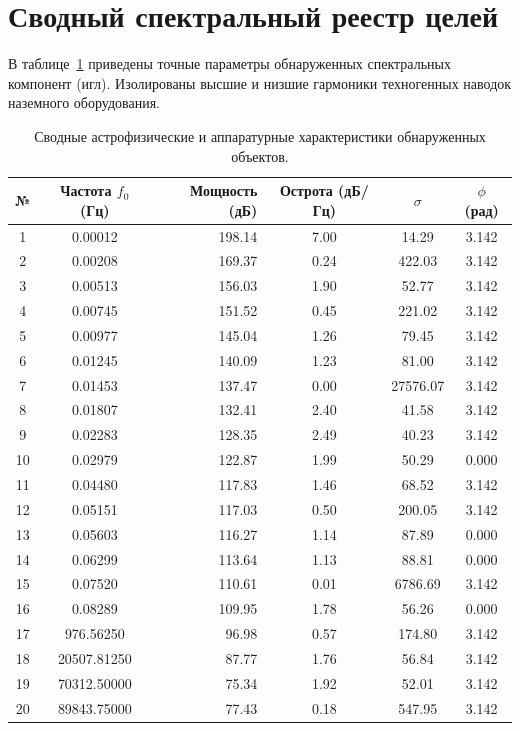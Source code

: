 \documentclass[11pt,twocolumn]{article}
\begin{document}
\section{Сводный спектральный реестр целей}
В таблице~\ref{tab:targets} приведены точные параметры обнаруженных спектральных компонент (игл). 
Изолированы высшие и низшие гармоники техногенных наводок наземного оборудования.\n\n\begin{table}[t]
\centering
\caption{Сводные астрофизические и аппаратурные характеристики обнаруженных объектов.}
\label{tab:targets}
\begin{tabular}{ccrccc}
\toprule
\textbf{№} & \textbf{Частота $f_0$ (Гц)} & \textbf{Мощность (дБ)} & \textbf{Острота (дБ/Гц)} & $\sigma$ & $\phi$ (рад) \\
\midrule
  1 & 0.00012 & 198.14 & 7.00 & 14.29 & 3.142 \\
  2 & 0.00208 & 169.37 & 0.24 & 422.03 & 3.142 \\
  3 & 0.00513 & 156.03 & 1.90 & 52.77 & 3.142 \\
  4 & 0.00745 & 151.52 & 0.45 & 221.02 & 3.142 \\
  5 & 0.00977 & 145.04 & 1.26 & 79.45 & 3.142 \\
  6 & 0.01245 & 140.09 & 1.23 & 81.00 & 3.142 \\
  7 & 0.01453 & 137.47 & 0.00 & 27576.07 & 3.142 \\
  8 & 0.01807 & 132.41 & 2.40 & 41.58 & 3.142 \\
  9 & 0.02283 & 128.35 & 2.49 & 40.23 & 3.142 \\
  10 & 0.02979 & 122.87 & 1.99 & 50.29 & 0.000 \\
  11 & 0.04480 & 117.83 & 1.46 & 68.52 & 3.142 \\
  12 & 0.05151 & 117.03 & 0.50 & 200.05 & 3.142 \\
  13 & 0.05603 & 116.27 & 1.14 & 87.89 & 0.000 \\
  14 & 0.06299 & 113.64 & 1.13 & 88.81 & 0.000 \\
  15 & 0.07520 & 110.61 & 0.01 & 6786.69 & 3.142 \\
  16 & 0.08289 & 109.95 & 1.78 & 56.26 & 0.000 \\
  17 & 976.56250 & 96.98 & 0.57 & 174.80 & 3.142 \\
  18 & 20507.81250 & 87.77 & 1.76 & 56.84 & 3.142 \\
  19 & 70312.50000 & 75.34 & 1.92 & 52.01 & 3.142 \\
  20 & 89843.75000 & 77.43 & 0.18 & 547.95 & 3.142 \\

\end{tabular}
\end{table}
\end{document}
